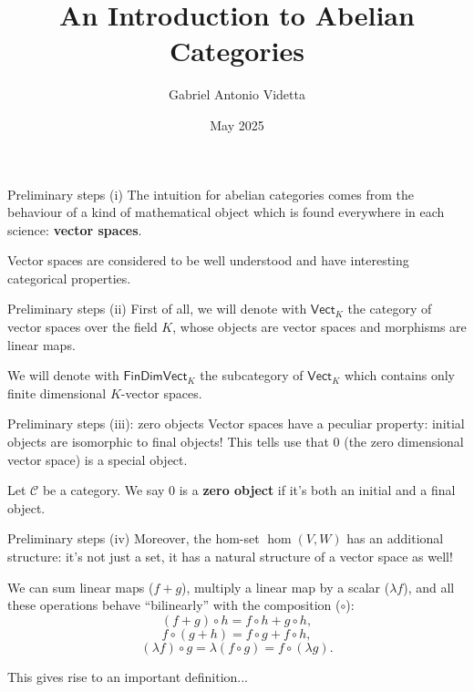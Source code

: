\documentclass{beamer}
\title{An Introduction to Abelian Categories}
\author{Gabriel Antonio Videtta}
\date{May 2025}
\newcommand{\cat}[1]{\mathsf{#1}}
\begin{document}
\begin{frame}
    \titlepage
\end{frame}

\begin{frame}{Preliminary steps (i)}
    The intuition for abelian categories comes from the
    behaviour of a kind of
    mathematical object which is found
    everywhere in each science: \textbf{vector spaces}. \bigskip


    Vector spaces are considered to be well understood
    and have interesting categorical properties.
\end{frame}

\begin{frame}{Preliminary steps (ii)}
    First of all, we will denote with $\cat{Vect}_K$ the category
    of vector spaces over the field $K$, whose objects are vector spaces and
    morphisms are linear maps. \bigskip


    We will denote with $\cat{FinDimVect}_K$ the subcategory
    of $\cat{Vect}_K$ which contains only finite dimensional
    $K$-vector spaces.
\end{frame}

\begin{frame}{Preliminary steps (iii): zero objects}
    Vector spaces have a peculiar property: initial objects are
    isomorphic to final objects! This tells use that $0$ (the
    zero dimensional vector space) is a special object.
    
    \begin{definition}
        Let $\mathcal{C}$ be a category. We say $0$ is a
        \textbf{zero object} if it's both an initial and
        a final object.
    \end{definition}
\end{frame}

\begin{frame}{Preliminary steps (iv)}
    Moreover, the hom-set $\hom(V, W)$ has an additional
    structure: it's not just a set, it has a natural structure
    of a vector space as well! \medskip

    We can sum linear maps ($f + g$), multiply a linear map by
    a scalar ($\lambda f$), and all these operations behave
    ``bilinearly'' with the composition ($\circ$):
    \[
        (f + g) \circ h = f \circ h + g \circ h,
    \]
    \[
        f \circ (g + h) = f \circ g + f \circ h,
    \]
    \[
        (\lambda f) \circ g = \lambda (f \circ g) = f \circ (\lambda g).
    \]

    This gives rise to an important definition...
\end{frame}
\end{document}
